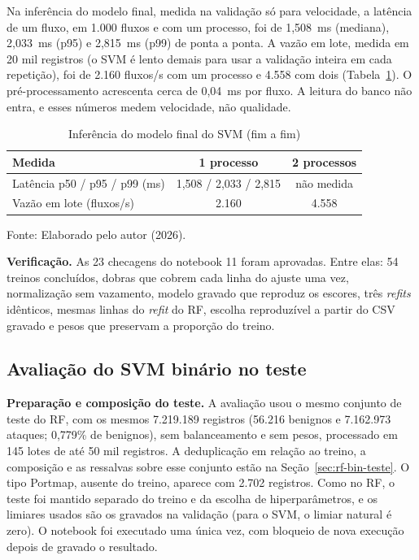 \documentclass[
    12pt,                %
    openright,           %
    oneside,             %
    a4paper,             %
    english,             %
    brazil               %
]{abntex2}
\begin{document}
Na inferência do modelo final, medida na validação só para velocidade, a latência de um fluxo, em 1.000 fluxos e com um processo, foi de 1,508~ms (mediana), 2,033~ms (p95) e 2,815~ms (p99) de ponta a ponta. A vazão em lote, medida em 20 mil registros (o SVM é lento demais para usar a validação inteira em cada repetição), foi de 2.160 fluxos/s com um processo e 4.558 com dois (Tabela~\ref{tab:svm-inferencia}). O pré-processamento acrescenta cerca de 0,04~ms por fluxo. A leitura do banco não entra, e esses números medem velocidade, não qualidade.

\begin{table}
\centering
\caption{Inferência do modelo final do SVM (fim a fim)}
\label{tab:svm-inferencia}
\begin{tabular}{lcc}
\hline
Medida & 1 processo & 2 processos \\
\hline
Latência p50 / p95 / p99 (ms) & 1,508 / 2,033 / 2,815 & não medida \\
Vazão em lote (fluxos/s) & 2.160 & 4.558 \\
\hline
\end{tabular}
\par\smallskip
Fonte: Elaborado pelo autor (2026).
\end{table}

\textbf{Verificação.} As 23 checagens do notebook 11 foram aprovadas. Entre elas: 54 treinos concluídos, dobras que cobrem cada linha do ajuste uma vez, normalização sem vazamento, modelo gravado que reproduz os escores, três \textit{refits} idênticos, mesmas linhas do \textit{refit} do RF, escolha reproduzível a partir do CSV gravado e pesos que preservam a proporção do treino.


\subsection{Avaliação do SVM binário no teste}
\label{sec:svm-bin-teste}

\textbf{Preparação e composição do teste.} A avaliação usou o mesmo conjunto de teste do RF, com os mesmos 7.219.189 registros (56.216 benignos e 7.162.973 ataques; 0,779\% de benignos), sem balanceamento e sem pesos, processado em 145 lotes de até 50 mil registros. A deduplicação em relação ao treino, a composição e as ressalvas sobre esse conjunto estão na Seção~\ref{sec:rf-bin-teste}. O tipo Portmap, ausente do treino, aparece com 2.702 registros. Como no RF, o teste foi mantido separado do treino e da escolha de hiperparâmetros, e os limiares usados são os gravados na validação (para o SVM, o limiar natural é zero). O notebook foi executado uma única vez, com bloqueio de nova execução depois de gravado o resultado.
\end{document}
